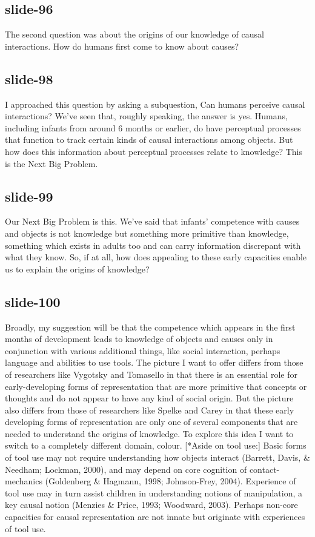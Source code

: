 \documentclass[12pt,\papersize]{extarticle}
\begin{document}
 
\subsection{slide-96}
The second question was about the origins of our knowledge of causal interactions. How do humans first come to know about causes?
 
 
\subsection{slide-98}
I approached this question by asking a subquestion, Can humans perceive causal interactions? We've seen that, roughly speaking, the answer is yes. Humans, including infants from around 6 months or earlier, do have perceptual processes that function to track certain kinds of causal interactions among objects.
But how does this information about perceptual processes relate to knowledge? This is the Next Big Problem.
 
 
\subsection{slide-99}
Our Next Big Problem is this. We've said that infants' competence with causes and objects is not knowledge but something more primitive than knowledge, something which exists in adults too and can carry information discrepant with what they know. So, if at all, how does appealing to these early capacities enable us to explain the origins of knowledge?
 
 
\subsection{slide-100}
Broadly, my suggestion will be that the competence which appears in the first months of development leads to knowledge of objects and causes only in conjunction with various additional things, like social interaction, perhaps language and abilities to use tools.
The picture I want to offer differs from those of researchers like Vygotsky and Tomasello in that there is an essential role for early-developing forms of representation that are more primitive that concepts or thoughts and do not appear to have any kind of social origin.
But the picture also differs from those of researchers like Spelke and Carey in that these early developing forms of representation are only one of several components that are needed to understand the origins of knowledge.
To explore this idea I want to switch to a completely different domain, colour.
[*Aside on tool use:] Basic forms of tool use may not require understanding how objects interact (Barrett, Davis, \& Needham; Lockman, 2000), and may depend on core cognition of contact-mechanics (Goldenberg \& Hagmann, 1998; Johnson-Frey, 2004). Experience of tool use may in turn assist children in understanding notions of manipulation, a key causal notion (Menzies \& Price, 1993; Woodward, 2003). Perhaps non-core capacities for causal representation are not innate but originate with experiences of tool use.
 






\end{document}
